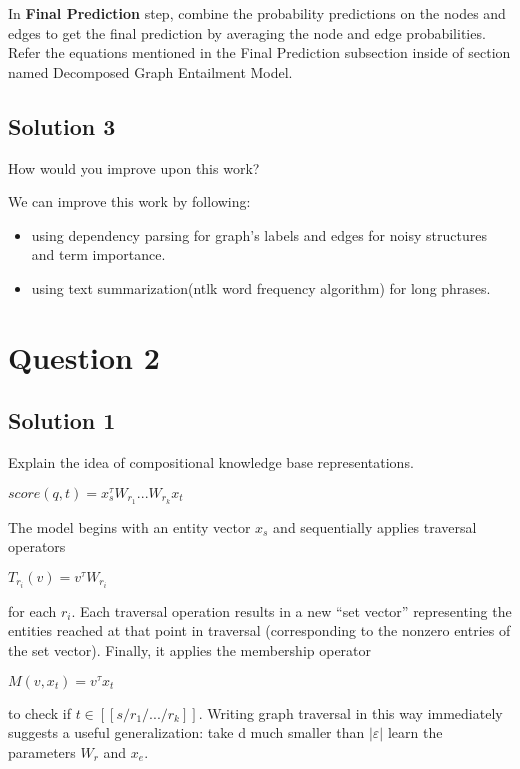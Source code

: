 \documentclass[12pt,leqno,a4paper]{article}
\begin{document}
In \textbf{Final Prediction} step, combine the probability predictions on the nodes and edges to get the final prediction by averaging the node
and edge probabilities. Refer the equations mentioned in the Final Prediction subsection inside of section named Decomposed Graph Entailment Model. 



\subsection{Solution 3}
How would you improve upon this work?
\newline

We can improve this work by following:
\begin{itemize}
    \item using dependency parsing for graph's labels and edges for noisy structures and term importance. 
    \item using text summarization(ntlk word frequency algorithm) for long phrases.
    
    
\end{itemize}


\section{Question 2}

\subsection{Solution 1}
Explain the idea of compositional knowledge base representations.
\newline

$score(q,t) = x_{s}^{\tau}W_{r_1}...W_{r_k}x_t $
\newline

The model begins with an entity vector $x_s$  and sequentially
applies traversal operators 

$T_{r_i}(v)= v^{\tau} W_{r_i}$ 

for each $r_i$. Each traversal operation results in a new “set vector” representing the entities reached
at that point in traversal (corresponding to the
nonzero entries of the set vector). Finally, it applies the membership operator 

$M(v,x_t) = v^{\tau} x_t$ 

to check if $t \in [[s/r_{1}/.../r_{k}]]$. Writing graph
traversal in this way immediately suggests a useful
generalization: take d much smaller than $|\varepsilon|$ learn the parameters $W_r$ and $x_e$.
\end{document}
